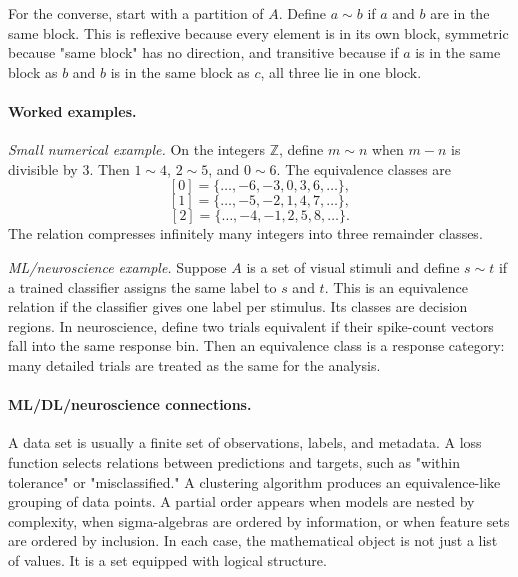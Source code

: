 For the converse, start with a partition of \(A\). Define \(a\sim b\) if \(a\) and \(b\) are in the same block. This is reflexive because every element is in its own block, symmetric because "same block" has no direction, and transitive because if \(a\) is in the same block as \(b\) and \(b\) is in the same block as \(c\), all three lie in one block.

\paragraph{Worked examples.}
\emph{Small numerical example.} On the integers \(\mathbb{Z}\), define \(m\sim n\) when \(m-n\) is divisible by \(3\). Then \(1\sim4\), \(2\sim5\), and \(0\sim6\). The equivalence classes are
\[
[0]=\{\ldots,-6,-3,0,3,6,\ldots\},
\]
\[
[1]=\{\ldots,-5,-2,1,4,7,\ldots\},
\]
\[
[2]=\{\ldots,-4,-1,2,5,8,\ldots\}.
\]
The relation compresses infinitely many integers into three remainder classes.

\emph{ML/neuroscience example.} Suppose \(A\) is a set of visual stimuli and define \(s\sim t\) if a trained classifier assigns the same label to \(s\) and \(t\). This is an equivalence relation if the classifier gives one label per stimulus. Its classes are decision regions. In neuroscience, define two trials equivalent if their spike-count vectors fall into the same response bin. Then an equivalence class is a response category: many detailed trials are treated as the same for the analysis.

\paragraph{ML/DL/neuroscience connections.}
A data set is usually a finite set of observations, labels, and metadata. A loss function selects relations between predictions and targets, such as "within tolerance" or "misclassified." A clustering algorithm produces an equivalence-like grouping of data points. A partial order appears when models are nested by complexity, when sigma-algebras are ordered by information, or when feature sets are ordered by inclusion. In each case, the mathematical object is not just a list of values. It is a set equipped with logical structure.

